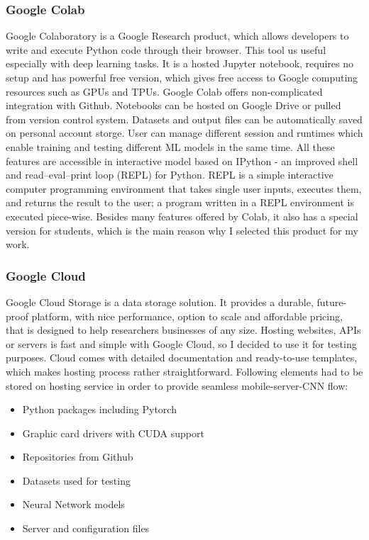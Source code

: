 \documentclass[../Main.tex]{subfiles}
\begin{document}
    \subsubsection{Google Colab}
    Google Colaboratory is a Google Research product, which allows developers to write and execute Python code through their browser. This tool us useful especially with deep learning tasks. It is a hosted Jupyter notebook, requires no setup and has powerful free version, which gives free access to Google computing resources such as GPUs and TPUs. 
    Google Colab offers non-complicated integration with Github. Notebooks can be hosted on Google Drive or pulled from version control system. Datasets and output files can be automatically saved on personal account storge. User can manage different session and runtimes which enable training and testing different ML models in the same time.
    All these features are accessible in interactive model based on IPython - an improved shell and read–eval–print loop (REPL) for Python. REPL is a simple interactive computer programming environment that takes single user inputs, executes them, and returns the result to the user; a program written in a REPL environment is executed piece-wise.
    Besides many features offered by Colab, it also has a special version for students, which is the main reason why I selected this product for my work. 

    \subsubsection{Google Cloud}
    Google Cloud Storage is a data storage solution. It provides a durable, future-proof platform, with nice performance, option to scale and affordable pricing, that is designed to help researchers businesses of any size. Hosting websites, APIs or servers is fast and simple with Google Cloud, so I decided to use it for testing purposes. Cloud comes with detailed documentation and ready-to-use templates, which makes hosting process rather straightforward. 
    Following elements had to be stored on hosting service in order to provide seamless mobile-server-CNN flow:
    \begin{itemize}
        \item Python packages including Pytorch
        \item Graphic card drivers with CUDA support
        \item Repositories from Github
        \item Datasets used for testing 
        \item Neural Network models
        \item Server and configuration files
    \end{itemize}
    
\end{document}
